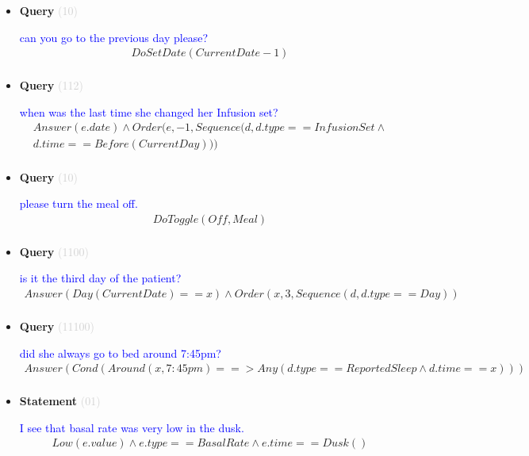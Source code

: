 \documentclass[11pt]{article}
\newcommand{\key}[1]{\textcolor{lightgray}{#1}}
\newcounter{CQuery}
\newcounter{CStatement}
\begin{document}
\begin{itemize}
\item
\textbf{Query\theCQuery} \key{(10)} \addtocounter{CQuery}{1}
\textcolor{blue}{ can you go to the previous day please? }
\begin{multline*}
DoSetDate(CurrentDate - 1) \\ 
\end{multline*}


\item
\textbf{Query\theCQuery} \key{(112)} \addtocounter{CQuery}{1}
\textcolor{blue}{ when was the last time she changed her Infusion set? }
\begin{multline*}
Answer(e.date) \wedge Order(e, -1, Sequence(d, d.type==InfusionSet\wedge \\ 
d.time==Before(CurrentDay))) \\ 
\end{multline*}


\item
\textbf{Query\theCQuery} \key{(10)} \addtocounter{CQuery}{1}
\textcolor{blue}{ please turn the meal off. }
\begin{multline*}
DoToggle(Off, Meal) \\ 
\end{multline*}


\item
\textbf{Query\theCQuery} \key{(1100)} \addtocounter{CQuery}{1}
\textcolor{blue}{ is it the third day of the patient? }
\begin{multline*}
Answer(Day(CurrentDate)==x) \wedge Order(x, 3, Sequence(d, d.type==Day)) \\ 
\end{multline*}


\item
\textbf{Query\theCQuery} \key{(11100)} \addtocounter{CQuery}{1}
\textcolor{blue}{ did she always go to bed around 7:45pm? }
\begin{multline*}
Answer(Cond(Around(x, 7:45pm) ==> Any(d.type==ReportedSleep \wedge d.time==x))) \\ 
\end{multline*}


\item
\textbf{Statement\theCStatement} \key{(01)} \addtocounter{CStatement}{1}
\textcolor{blue}{ I see that basal rate was very low in the dusk. }
\begin{multline*}
Low(e.value) \wedge e.type==BasalRate \wedge e.time==Dusk() \\ 
\end{multline*}



\end{itemize}
\end{document}
